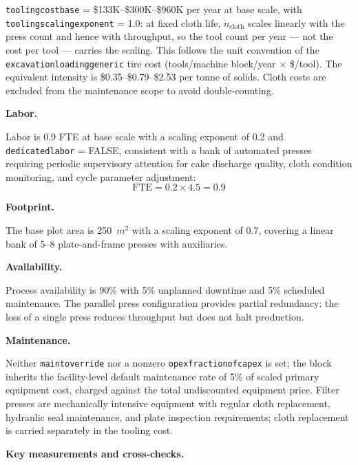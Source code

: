 \documentclass{article}
\renewcommand\_{\textunderscore\allowbreak}
\begin{document}
\noindent \texttt{tooling\_cost\_base} = \$133K--\$300K--\$960K per year at base scale, with \texttt{tooling\_scaling\_exponent} = 1.0: at fixed cloth life, $\dot{n}_\text{cloth}$ scales linearly with the press count and hence with throughput, so the tool count per year --- not the cost per tool --- carries the scaling. This follows the unit convention of the \texttt{excavation\_loading\_generic} tire cost (tools/machine block/year $\times$ \$/tool). The equivalent intensity is \$0.35--\$0.79--\$2.53 per tonne of solids. Cloth costs are excluded from the maintenance scope to avoid double-counting.

\medskip
\noindent\textbf{Labor.}\quad

Labor is 0.9 FTE at base scale with a scaling exponent of 0.2 and \texttt{dedicated\_labor} = FALSE, consistent with a bank of automated presses requiring periodic supervisory attention for cake discharge quality, cloth condition monitoring, and cycle parameter adjustment:
\[
	\text{FTE} = 0.2 \times 4.5 = 0.9
\]

\medskip
\noindent\textbf{Footprint.}\quad

The base plot area is 250~$\si{m^2}$ with a scaling exponent of 0.7, covering a linear bank of 5--8 plate-and-frame presses with auxiliaries.

\medskip
\noindent\textbf{Availability.}\quad

Process availability is 90\% with 5\% unplanned downtime and 5\% scheduled maintenance. The parallel press configuration provides partial redundancy: the loss of a single press reduces throughput but does not halt production.

\medskip
\noindent\textbf{Maintenance.}\quad

Neither \texttt{maint\_override} nor a nonzero \texttt{opex\_fraction\_of\_capex} is set; the block inherits the facility-level default maintenance rate of 5\% of scaled primary equipment cost, charged against the total undiscounted equipment price. Filter presses are mechanically intensive equipment with regular cloth replacement, hydraulic seal maintenance, and plate inspection requirements; cloth replacement is carried separately in the tooling cost.

\medskip
\noindent\textbf{Key measurements and cross-checks.}\quad
\end{document}
